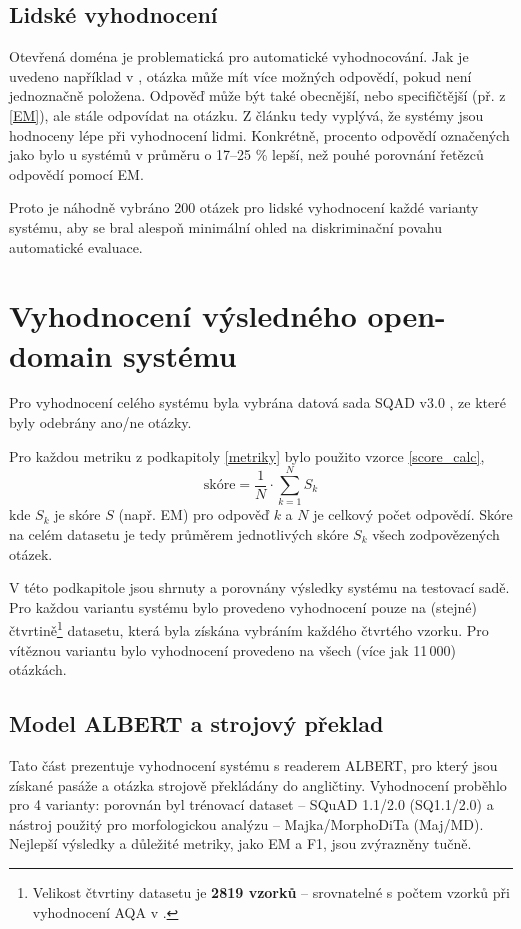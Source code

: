 \subsection{Lidské vyhodnocení}
Otevřená doména je problematická pro automatické vyhodnocování. Jak je uvedeno například v \cite{min2021neurips}, otázka může mít více možných odpovědí, pokud není jednoznačně položena. Odpověď může být také obecnější, nebo specifičtější (př. z \ref{EM}), ale stále odpovídat na otázku. Z článku \cite{min2021neurips} tedy vyplývá, že systémy jsou hodnoceny lépe při vyhodnocení lidmi. Konkrétně, procento odpovědí označených jako  bylo u systémů v průměru o 17--25 \% lepší, než pouhé porovnání řetězců odpovědí pomocí EM.\par
Proto je náhodně vybráno 200 otázek pro lidské vyhodnocení každé varianty systému, aby se bral alespoň minimální ohled na diskriminační povahu automatické evaluace.

\section{Vyhodnocení výsledného open-domain systému}
Pro vyhodnocení celého systému byla vybrána datová sada SQAD v3.0 \cite{sqad}, ze které byly odebrány ano/ne otázky.\par
Pro každou metriku z podkapitoly \ref{metriky} bylo použito vzorce \ref{score_calc},
\begin{equation}
    \label{score_calc}
    \text{skóre} = \frac{1}{N}\cdot \sum^N_{k=1} S_k
\end{equation}
kde $S_k$ je skóre $S$ (např. EM) pro odpověď $k$ a $N$ je celkový počet odpovědí. Skóre na celém datasetu je tedy průměrem jednotlivých skóre $S_k$ všech zodpovězených otázek.\par
V této podkapitole jsou shrnuty a porovnány výsledky systému na testovací sadě. Pro každou variantu systému bylo provedeno vyhodnocení pouze na (stejné) čtvrtině\footnote{Velikost čtvrtiny datasetu je \textbf{2819 vzorků} -- srovnatelné s počtem vzorků při vyhodnocení AQA v \cite{aqa2018}.} datasetu, která byla získána vybráním každého čtvrtého vzorku. Pro vítěznou variantu bylo vyhodnocení provedeno na všech (více jak 11\,000) otázkách.

\subsection{Model ALBERT a strojový překlad}
\label{albert_eval}
Tato část prezentuje vyhodnocení systému s readerem ALBERT, pro který jsou získané pasáže a otázka strojově překládány do angličtiny. Vyhodnocení proběhlo pro 4 varianty: porovnán byl trénovací dataset -- SQuAD 1.1/2.0 (SQ1.1/2.0) a nástroj použitý pro morfologickou analýzu -- Majka/MorphoDiTa (Maj/MD). Nejlepší výsledky a důležité metriky, jako EM a F1, jsou zvýrazněny tučně.

